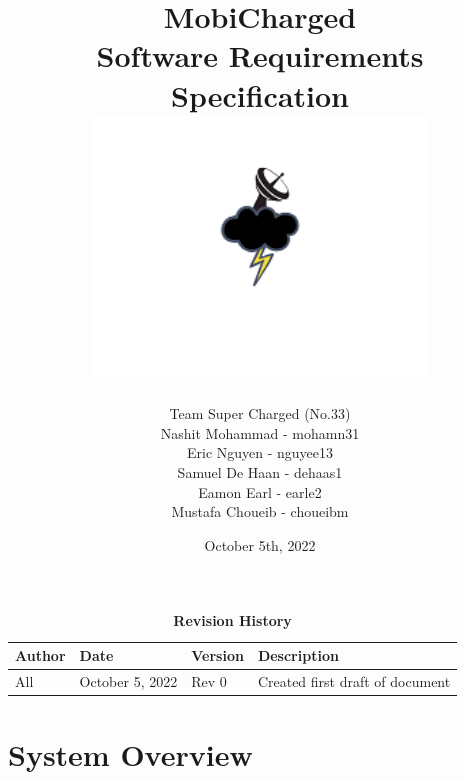 \documentclass[12pt, titlepage]{article}
\begin{document}
\title{
    MobiCharged\\Software Requirements Specification
    \includegraphics[width=9cm]{images/mobicharged.png} 
}
\author{Team Super Charged (No.33)
		\\ Nashit Mohammad - mohamn31
		\\ Eric Nguyen - nguyee13
		\\ Samuel De Haan - dehaas1
		\\ Eamon Earl - earle2
		\\ Mustafa Choueib - choueibm
}
    

\date{October 5th, 2022}


\maketitle

\tableofcontents
\listoffigures
\listoftables

\vspace{20pt}
\begin{center}
\begin{table}[H]
\caption{\bf Revision History}
    \begin{tabular}{p{2cm}p{3cm}p{2cm}p{6cm}}
    \hline
    \bf Author & \bf Date & \bf Version & \bf Description\\
    \hline
    All & October 5, 2022 & Rev 0 & Created first draft of document\\
    \hline
    \end{tabular}
\end{table}
\end{center}

\newpage


\section{System Overview}
\end{document}
